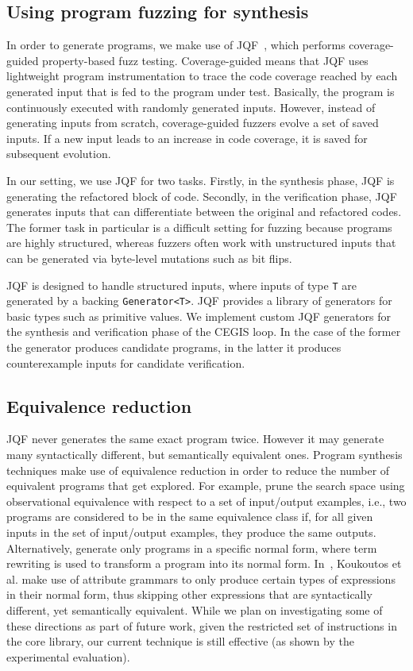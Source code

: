 \documentclass[sigconf,review,anonymous]{acmart}
\begin{document}
\subsection{Using program fuzzing for synthesis} \label{sec:fuzzing}

In order to generate programs, we make use of JQF~\cite{DBLP:conf/issta/PadhyeLS19}, which performs 
coverage-guided property-based fuzz testing.
Coverage-guided means that JQF uses lightweight program
instrumentation to trace the code coverage reached by each generated
input that is fed to the program under test.  Basically, the program
is continuously executed with randomly generated inputs. However,
instead of generating inputs from scratch, coverage-guided fuzzers
evolve a set of saved inputs. If a new input leads to an increase
in code coverage, it is saved for subsequent evolution.

In our setting, we use JQF for two tasks. Firstly, in the synthesis phase, 
JQF is generating the refactored block of code.
Secondly, in the verification phase, JQF generates
inputs that can differentiate between the original and refactored codes.
The former task in particular is a difficult setting for fuzzing because programs are
highly structured, whereas fuzzers often work with unstructured inputs
that can be generated via byte-level mutations such as bit flips.

JQF is designed to handle structured inputs, where inputs of type \texttt{T}
are generated by a backing \texttt{Generator<T>}. JQF provides a library of
generators for basic types such as primitive values. We implement custom
JQF generators for the synthesis and verification phase of the CEGIS loop. In
the case of the former the generator produces candidate programs, in the latter
it produces counterexample inputs %
for candidate verification.

\subsection{Equivalence reduction}
JQF never generates the same exact program twice. However it may generate many
syntactically different, but semantically equivalent ones.
Program synthesis techniques make use of equivalence reduction in order to
reduce the number of equivalent programs that get explored.
For example, \citet{DBLP:conf/cav/AlbarghouthiGK13} 
prune the search space using observational equivalence with respect to a set of input/output examples, i.e., two programs are considered to be in the same equivalence class if, for all given inputs in the set of input/output examples, they produce the same outputs. Alternatively, \citet{DBLP:conf/vmcai/SmithA19} generate only programs in a specific normal form, where term rewriting is used to transform a program into its normal form. In~\cite{DBLP:journals/corr/KoukoutosKK16}, Koukoutos et al. make use of attribute grammars to only produce certain types of expressions in their normal form, thus skipping other expressions
that are syntactically different, yet semantically equivalent.
While we plan on investigating some of these directions as part of future work,
given the restricted set of instructions in the core library,
our current technique is still effective (as shown by the experimental evaluation).
\end{document}

